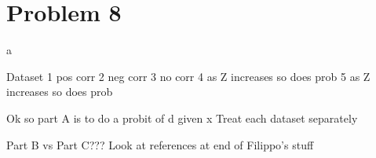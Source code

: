 \documentclass{article}
\begin{document}
\section*{Problem 8}
 
\begin{problem}{a}
\end{problem}
\begin{solution}
Dataset
1 pos corr
2 neg corr
3 no corr
4 as Z increases so does prob
5 as Z increases so does prob

Ok so part A is to do a probit of d given x
Treat each dataset separately

Part B vs Part C???
Look at references at end of Filippo's stuff


\end{solution}
\end{document}
